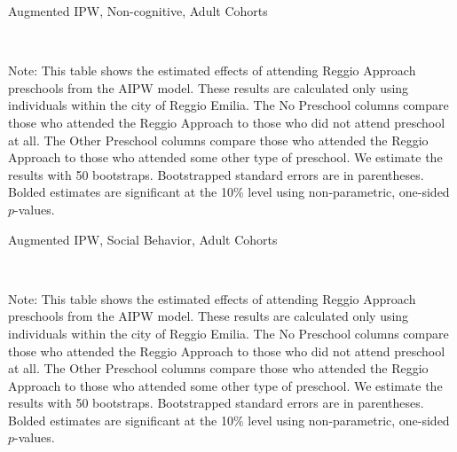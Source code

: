 \begin{landscape}
\begin{table}[H] \caption{Augmented IPW, Non-cognitive, Adult Cohorts} \label{ipw-adult-N}
	
	\vspace{1ex} \\
\footnotesize\raggedright{Note: This table shows the estimated effects of attending Reggio Approach preschools from the AIPW model. These results are calculated only using individuals within the city of Reggio Emilia. The No Preschool columns compare those who attended the Reggio Approach to those who did not attend preschool at all. The Other Preschool columns compare those who attended the Reggio Approach to those who attended some other type of preschool. We estimate the results with 50 bootstraps. Bootstrapped standard errors are in parentheses. Bolded estimates are significant at the 10\% level using non-parametric, one-sided $p$-values.}
\end{table}

\begin{table}[H] \caption{Augmented IPW, Social Behavior, Adult Cohorts} \label{ipw-adult-S}
	
	\vspace{1ex} \\
\footnotesize\raggedright{Note: This table shows the estimated effects of attending Reggio Approach preschools from the AIPW model. These results are calculated only using individuals within the city of Reggio Emilia. The No Preschool columns compare those who attended the Reggio Approach to those who did not attend preschool at all. The Other Preschool columns compare those who attended the Reggio Approach to those who attended some other type of preschool. We estimate the results with 50 bootstraps. Bootstrapped standard errors are in parentheses. Bolded estimates are significant at the 10\% level using non-parametric, one-sided $p$-values.}
\end{table}

\end{landscape}